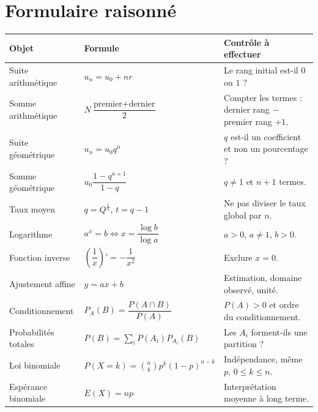 \chapter{Formulaire raisonné}
\begin{longtable}{p{}p{}p{}}
\toprule
Objet & Formule & Contrôle à effectuer\\
\midrule
Suite arithmétique & $u_n=u_0+nr$ & Le rang initial est-il $0$ ou $1$ ?\\
Somme arithmétique & $N\dfrac{\text{premier}+\text{dernier}}2$ & Compter les termes : dernier rang $-$ premier rang $+1$.\\
Suite géométrique & $u_n=u_0q^n$ & $q$ est-il un coefficient et non un pourcentage ?\\
Somme géométrique & $u_0\dfrac{1-q^{n+1}}{1-q}$ & $q\neq1$ et $n+1$ termes.\\
Taux moyen & $q=Q^{\frac1n}$, $t=q-1$ & Ne pas diviser le taux global par $n$.\\
Logarithme & $a^x=b\iff x=\dfrac{\log b}{\log a}$ & $a>0$, $a\neq1$, $b>0$.\\
Fonction inverse & $\left(\dfrac1x\right)'=-\dfrac1{x^2}$ & Exclure $x=0$.\\
Ajustement affine & $y=ax+b$ & Estimation, domaine observé, unité.\\
Conditionnement & $P_A(B)=\dfrac{P(A\cap B)}{P(A)}$ & $P(A)>0$ et ordre du conditionnement.\\
Probabilités totales & $P(B)=\sum_iP(A_i)P_{A_i}(B)$ & Les $A_i$ forment-ils une partition ?\\
Loi binomiale & $P(X=k)=\binom nkp^k(1-p)^{n-k}$ & Indépendance, même $p$, $0\leq k\leq n$.\\
Espérance binomiale & $E(X)=np$ & Interprétation moyenne à long terme.\\
\bottomrule
\end{longtable}

